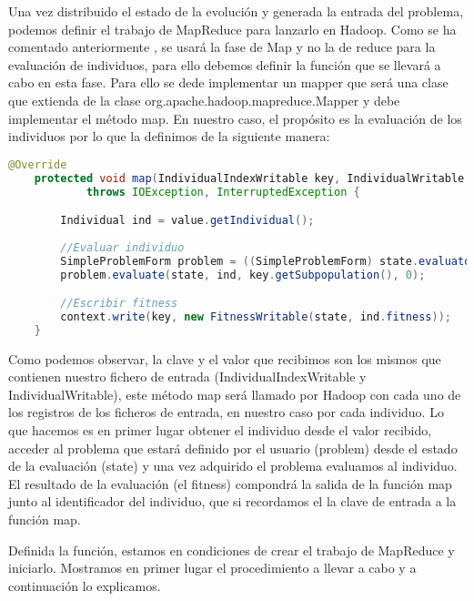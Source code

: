 Una vez distribuido el estado de la evolución y generada la entrada del problema, podemos definir el trabajo de MapReduce para lanzarlo en Hadoop. Como se ha comentado anteriormente , se usar\'a la fase de Map y no la de reduce para la evaluación de individuos, para ello debemos definir la función que se llevar\'a a cabo en esta fase. Para ello se dede implementar un mapper que ser\'a una clase que extienda de la clase org.apache.hadoop.mapreduce.Mapper y debe implementar el método map. En nuestro caso, el propósito es la evaluación de los individuos por lo que la definimos de la siguiente manera:

\begin{lstlisting}[language=Java]
	@Override
	protected void map(IndividualIndexWritable key, IndividualWritable value, Context context)
			throws IOException, InterruptedException {

		Individual ind = value.getIndividual();
		
		//Evaluar individuo
		SimpleProblemForm problem = ((SimpleProblemForm) state.evaluator.p_problem);
		problem.evaluate(state, ind, key.getSubpopulation(), 0);

		//Escribir fitness
		context.write(key, new FitnessWritable(state, ind.fitness));
	}
\end{lstlisting}

Como podemos observar, la clave y el valor que recibimos son los mismos que contienen nuestro fichero de entrada (IndividualIndexWritable y IndividualWritable), este método map ser\'a llamado por Hadoop con cada uno de los registros de los ficheros de entrada, en nuestro caso por cada individuo. Lo que hacemos es en primer lugar obtener el individuo desde el valor recibido, acceder al problema que estará definido por el usuario (problem) desde el estado de la evaluación (state) y una vez adquirido el problema evaluamos al individuo. El resultado de la evaluación (el fitness)  compondrá la salida de la función map junto al identificador del individuo, que si recordamos el la clave de entrada a la función map.

Definida la función, estamos en condiciones de crear el trabajo de MapReduce y iniciarlo. Mostramos en primer lugar el procedimiento a llevar a cabo y a continuación lo explicamos.

